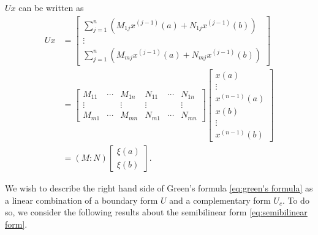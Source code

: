 \documentclass[11pt, oneside, a4paper]{article}
\begin{document}
\begin{rmk}
{    $Ux$ can be written as
    \begin{align*}
        Ux &= \begin{bmatrix}
            \sum_{j=1}^n (M_{1j}x^{(j-1)}(a) + N_{1j}x^{(j-1)}(b))\\
            \vdots\\
            \sum_{j=1}^n (M_{mj}x^{(j-1)}(a) + N_{mj}x^{(j-1)}(b))
        \end{bmatrix}\\
        &= \begin{bmatrix}
            M_{11} & \cdots & M_{1n} & N_{11} & \cdots & N_{1n}\\
            \vdots &  & \vdots & \vdots & & \vdots\\
            M_{m1} & \cdots & M_{mn} & N_{m1} & \cdots & N_{mn}
        \end{bmatrix} \begin{bmatrix}x(a)\\\vdots\\x^{(n-1)}(a)\\ x(b)\\\vdots\\x^{(n-1)}(b)\end{bmatrix}\\
        &= (M:N)\begin{bmatrix}
            \xi(a)\\
            \xi(b)
        \end{bmatrix}.
    \end{align*}
    }
\end{rmk}


We wish to describe the right hand side of Green's formula \eqref{eq:green's formula} as a linear combination of a boundary form $U$ and a complementary form $U_c$. To do so, we consider the following results about the semibilinear form \eqref{eq:semibilinear form}.
\end{document}
